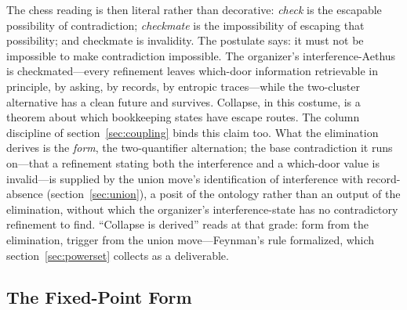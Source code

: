 \documentclass[11pt]{article}
\theoremstyle{definition}
\newcommand{\Aethus}{Aethus}
\begin{document}
The chess reading is then literal rather than decorative: \emph{check} is the escapable possibility of contradiction; \emph{checkmate} is the impossibility of escaping that possibility; and checkmate is invalidity. The postulate says: it must not be impossible to make contradiction impossible. The organizer's interference-\Aethus{} is checkmated---every refinement leaves which-door information retrievable in principle, by asking, by records, by entropic traces---while the two-cluster alternative has a clean future and survives. Collapse, in this costume, is a theorem about which bookkeeping states have escape routes.
The column discipline of section~\ref{sec:coupling} binds this claim too. What the elimination derives is the \emph{form}, the two-quantifier alternation; the base contradiction it runs on---that a refinement stating both the interference and a which-door value is invalid---is supplied by the union move's identification of interference with record-absence (section~\ref{sec:union}), a posit of the ontology rather than an output of the elimination, without which the organizer's interference-state has no contradictory refinement to find. ``Collapse is derived'' reads at that grade: form from the elimination, trigger from the union move---Feynman's rule formalized, which section~\ref{sec:powerset} collects as a deliverable.
\subsection{The Fixed-Point Form}\label{sec:fixedpoint}
\end{document}
